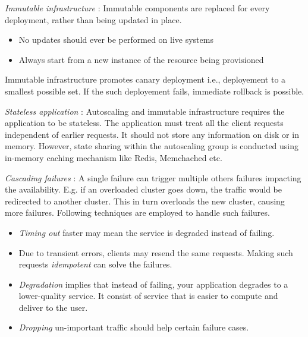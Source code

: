 \documentclass[conference]{IEEEtran}
\begin{document}
\par \textit{Immutable infrastructure} : Immutable components are replaced for every deployment, rather than being updated in place.
\begin{itemize}
\item No updates should ever be performed on live systems
\item Always start from a new instance of the resource being provisioned
\end{itemize}
Immutable infrastructure promotes canary deployment i.e., deployement to a smallest possible set. If the such deployement fails, immediate rollback is possible.

\par \textit{Stateless application} :
Autoscaling and immutable infrastructure requires the application to be stateless. The application must treat all the client requests independent of earlier requests. It should not store any information on disk or in memory. However, state sharing within the autoscaling group is conducted using in-memory caching mechanism like Redis, Memchached etc.

\par \textit{Cascading failures} :
A single failure can trigger multiple others failures impacting the availability. E.g. if an overloaded cluster goes down, the traffic would be redirected to another cluster. This in turn overloads the new cluster, causing more failures. Following techniques are employed to handle such failures.
\begin{itemize}
\item \textit{Timing out} faster may mean the service is degraded instead of failing.
\item Due to transient errors, clients may resend the same requests. Making such requests \textit{idempotent} can solve the failures.
\item \textit{Degradation} implies that instead of failing, your application degrades to a lower-quality service. It consist of service that is easier to compute and deliver to the user.
\item \textit{Dropping} un-important traffic should help certain failure cases.
\end{itemize}
\end{document}
